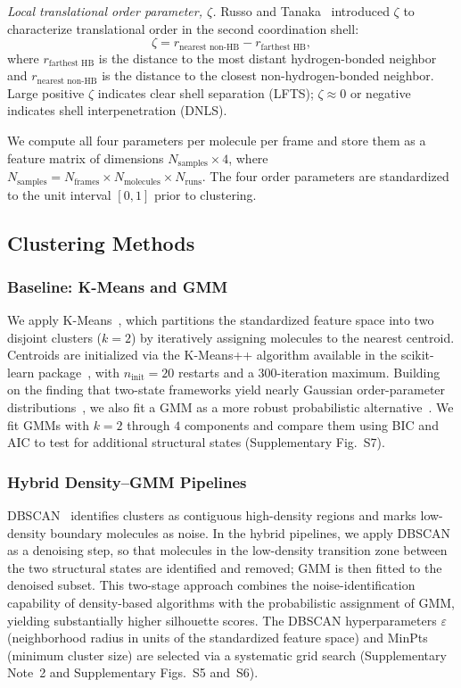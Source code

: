 \documentclass[aps, amsmath,amssymb, reprint, twocolumn, superscriptaddress]{revtex4-2}
\begin{document}
\textit{Local translational order parameter, $\zeta$.} Russo and Tanaka~\cite{russo_understanding_2014} introduced $\zeta$ to characterize translational order in the second coordination shell:
\begin{equation}
\zeta = r_{\text{nearest non-HB}} - r_{\text{farthest HB}},
\label{eq:zeta}
\end{equation}
where $r_{\text{farthest HB}}$ is the distance to the most distant hydrogen-bonded neighbor and $r_{\text{nearest non-HB}}$ is the distance to the closest non-hydrogen-bonded neighbor. Large positive $\zeta$ indicates clear shell separation (LFTS); $\zeta \approx 0$ or negative indicates shell interpenetration (DNLS).

We compute all four parameters per molecule per frame and store them as a feature matrix of dimensions $N_{\text{samples}} \times 4$, where $N_{\text{samples}} = N_{\text{frames}} \times N_{\text{molecules}} \times N_{\text{runs}}$. The four order parameters are standardized to the unit interval $[0,1]$ prior to clustering.

\subsection{Clustering Methods}
\label{sec:clustering_algorithm}

\subsubsection{Baseline: K-Means and GMM}
We apply K-Means~\cite{ikotun_k-means_2023}, which partitions the standardized feature space into two disjoint clusters ($k=2$) by iteratively assigning molecules to the nearest centroid. Centroids are initialized via the K-Means++ algorithm available in the scikit-learn package~\cite{scikit-learn}, with $n_{\text{init}} = 20$ restarts and a 300-iteration maximum. Building on the finding that two-state frameworks yield nearly Gaussian order-parameter distributions~\cite{shi_direct_2020}, we also fit a GMM as a more robust probabilistic alternative~\cite{deprez-2024}. We fit GMMs with $k = 2$ through $4$ components and compare them using BIC and AIC to test for additional structural states (Supplementary Fig.~S7).

\subsubsection{Hybrid Density--GMM Pipelines}
DBSCAN~\cite{ester_density-based_1996} identifies clusters as contiguous high-density regions and marks low-density boundary molecules as noise. In the hybrid pipelines, we apply DBSCAN as a denoising step, so that molecules in the low-density transition zone between the two structural states are identified and removed; GMM is then fitted to the denoised subset. This two-stage approach combines the noise-identification capability of density-based algorithms with the probabilistic assignment of GMM, yielding substantially higher silhouette scores. The DBSCAN hyperparameters $\varepsilon$ (neighborhood radius in units of the standardized feature space) and MinPts (minimum cluster size) are selected via a systematic grid search (Supplementary Note~2 and Supplementary Figs.~S5 and~S6).
\end{document}
